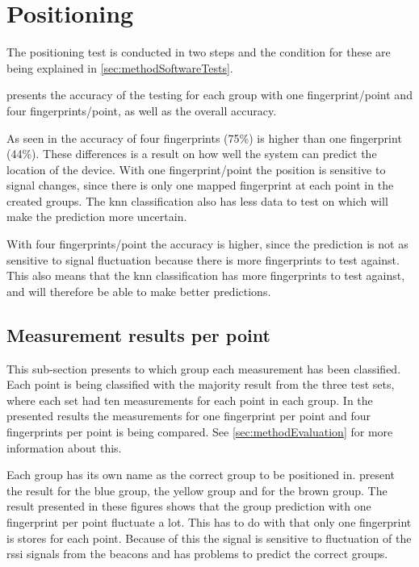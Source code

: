 \section{Positioning}\label{sec:resultPos}
The positioning test is conducted in two steps and the condition for these are being explained in \cref{sec:methodSoftwareTests}.

\bigskip

 presents the accuracy of the testing for each group with one fingerprint/point and four fingerprints/point, as well as the overall accuracy.


As seen in  the accuracy of four fingerprints (75\%) is higher than one fingerprint (44\%).
These differences is a result on how well the system can predict the location of the device.
With one fingerprint/point the position is sensitive to signal changes, since there is only one mapped fingerprint at each point in the created groups.
The \acrshort{knn} classification also has less data to test on which will make the prediction more uncertain.

\bigskip

With four fingerprints/point the accuracy is higher, since the prediction is not as sensitive to signal fluctuation because there is more fingerprints to test against.
This also means that the \acrshort{knn} classification has more fingerprints to test against, and will therefore be able to make better predictions.


\subsection{Measurement results per point}\label{sec:resultsPosOneFingerprint}
This sub-section presents to which group each measurement has been classified.
Each point is being classified with the majority result from the three test sets, where each set had ten measurements for each point in each group.
In the presented results the measurements for one fingerprint per point and four fingerprints per point is being compared.
See \cref{sec:methodEvaluation} for more information about this.

\bigskip

Each group has its own name as the correct group to be positioned in.
 present the result for the blue group,  the yellow group and  for the brown group.
The result presented in these figures shows that the group prediction with one fingerprint per point fluctuate a lot.
This has to do with that only one fingerprint is stores for each point.
Because of this the signal is sensitive to fluctuation of the \acrshort{rssi} signals from the beacons and has problems to predict the correct groups.

